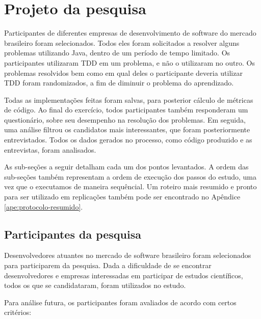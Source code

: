 \section{Projeto da pesquisa}

Participantes de diferentes empresas de desenvolvimento de software do mercado
brasileiro foram selecionados. Todos eles foram solicitados a resolver 
alguns problemas utilizando Java, dentro de um período de tempo limitado. 
Os participantes utilizaram TDD em um problema, e não o utilizaram
no outro. Os problemas resolvidos bem como em qual deles o participante
deveria utilizar TDD foram randomizados, a fim de diminuir o problema do aprendizado.

Todas as implementações feitas foram salvas, para posterior
cálculo de métricas de código. Ao final do exercício, todos participantes
também responderam um questionário, sobre seu desempenho na resolução dos problemas.
Em seguida, uma análise filtrou os candidatos
mais interessantes, que foram posteriormente entrevistados. 
Todos os dados gerados no processo, 
como código produzido e as entrevistas, foram analisados.

As sub-seções a seguir detalham cada um dos pontos levantados. A ordem das
sub-seções também representam a ordem de execução dos passos do estudo, uma vez
que o executamos de maneira sequêncial.
Um roteiro mais resumido e pronto para ser utilizado em replicações também pode
ser encontrado no Apêndice \ref{ape:protocolo-resumido}.

\subsection{Participantes da pesquisa}
\label{sec:planejamento-participantes}

Desenvolvedores atuantes no mercado de 
software brasileiro foram selecionados para participarem da pesquisa.
Dada a dificuldade de se
encontrar desenvolvedores e empresas interessadas em participar de
estudos científicos, todos os que se candidataram, foram utilizados no estudo.

Para análise futura, os participantes foram avaliados de acordo com
certos critérios:


